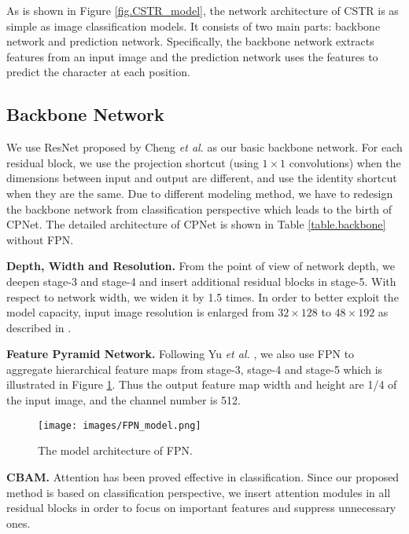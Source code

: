 \documentclass[final]{cvpr}
\begin{document}
As is shown in Figure \ref{fig.CSTR_model}, the network architecture of CSTR is as simple as image classification models. It consists of two main parts:
backbone network and prediction network.
Specifically, the backbone network extracts features from an input image and the prediction network uses the features to predict the character at each position.

\subsection{Backbone Network}
\label{section.bacbone_network}
We use ResNet proposed by Cheng \textit{et al.} \cite{cheng2017focusing} as our basic backbone network. For each residual block, we use the projection shortcut (using $1 \times 1$ convolutions) when the dimensions between input and output are different, and use the identity shortcut when they are the same.
Due to different modeling method, we have to redesign the backbone network from classification perspective which leads to the birth of CPNet. The detailed architecture of CPNet is shown in Table \ref{table.backbone} without FPN.

\textbf{Depth, Width and Resolution.}
From the point of view of network depth, we deepen stage-3 and stage-4 and insert additional residual blocks in stage-5. With respect to network width, we widen it by 1.5 times.
In order to better exploit the model capacity, input image resolution is enlarged from $32\times128$ to $48\times192$ as described in \cite{tan2019efficientnet}.

\textbf{Feature Pyramid Network.}
Following Yu \textit{et al.} \cite{yu2020towards}, we also use FPN \cite{lin2017feature} to aggregate hierarchical feature maps from stage-3, stage-4 and stage-5 which is illustrated in Figure \ref{fig.FPN_model}. Thus the output feature map width and height are 1/4 of the input image, and the channel number is 512.

\begin{figure}[ht]
\centering
  \texttt{[image: images/FPN\_model.png]}
\centering
\caption{The model architecture of FPN.}
\label{fig.FPN_model}
\end{figure}

\textbf{CBAM.}
Attention \cite{woo2018cbam} has been proved effective in classification. Since our proposed method is based on classification perspective, we insert attention modules \cite{woo2018cbam} in all residual blocks in order to focus on important features and suppress unnecessary ones.
\end{document}
